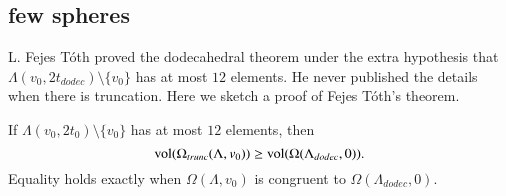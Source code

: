 \subsection{few spheres}

L. Fejes T\'oth proved  the dodecahedral theorem 
under the extra hypothesis that $\Lambda(v_0,2t_{dodec})\setminus\{v_0\}$
has at most $12$  elements.  He never published the details when
there is truncation. Here
we sketch a proof of Fejes T\'oth's theorem.

\begin{lemma}  If $\Lambda(v_0,2t_0)\setminus\{v_0\}$ has at most
$12$ elements, then
     $$
   {\operatorname{vol}}(\Omega_{trunc}(\Lambda,v_0))\ge {\operatorname{vol}}(\Omega(\Lambda_{dodec},0)).
   $$
Equality holds exactly when $\Omega(\Lambda,v_0)$ is congruent to
$\Omega(\Lambda_{dodec},0)$.
\end{lemma}

